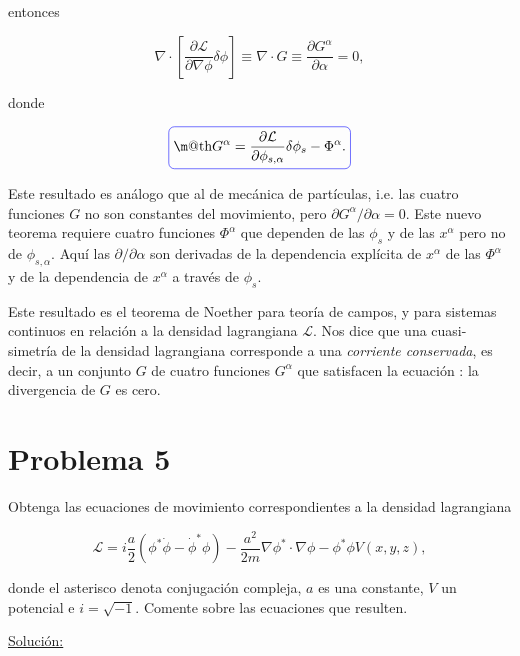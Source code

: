 \documentclass[a4paper,10pt]{article}
\makeatletter
\numberwithin{equation}{section}
\newcommand*{\boxcolor}{blue}
\renewcommand{\boxed}[1]{\textcolor{\boxcolor}{%
\tikz[baseline={([yshift=-1ex]current bounding box.center)}] \node [rectangle, minimum width=1ex,rounded corners,draw] {\normalcolor\m@th$\displaystyle#1$};}}
\makeatother
\begin{document}
entonces 

\begin{equation}
 \nabla \cdot \left[ \frac{\partial \mathcal{L}}{\partial \nabla \phi} \delta \phi \right] 
 \equiv \nabla \cdot G \equiv \frac{\partial G^\alpha}{\partial \alpha} = 0,
 \label{eq:noet9}
\end{equation}

donde 

\begin{equation}
 \boxed{G^\alpha = \frac{\partial \mathcal{L}}{\partial \phi_{s,\alpha}}\delta \phi_s - 
 \Phi^\alpha.}
 \label{eq:noet10}
\end{equation}

Este resultado es análogo que al de mecánica de partículas, i.e. las cuatro funciones 
$G$ no son constantes del movimiento, pero $\partial G^\alpha / \partial \alpha = 0$. Este nuevo 
teorema requiere cuatro funciones $\Phi^\alpha$ que dependen de las $\phi_s$ y de las 
$x^\alpha$ pero no de $\phi_{s,\alpha}$. Aquí las $\partial/\partial \alpha$ son derivadas 
de la dependencia explícita de $x^\alpha$ de las $\Phi^\alpha$ y de la dependencia de 
$x^\alpha$ a través de $\phi_s$. 

\vspace{.3cm}

Este resultado es el teorema de Noether para teoría de campos, y para sistemas continuos 
en relación a la densidad lagrangiana $\mathcal{L}$. Nos dice que una cuasi-simetría 
de la densidad lagrangiana corresponde a una \emph{corriente conservada}, es decir, 
a un conjunto $G$ de cuatro funciones $G^\alpha$ que satisfacen la ecuación 
: la divergencia de $G$ es cero.


\section{Problema 5}

Obtenga las ecuaciones de movimiento correspondientes a la densidad lagrangiana 

$$
\mathcal{L} = i\frac{a}{2} \left( \phi^*\dot{\phi} - \dot{\phi}^*\phi \right)  
- \frac{a^2}{2m}\nabla \phi^* \cdot \nabla \phi - \phi^*\phi V(x,y,z),
$$

donde el asterisco denota conjugación compleja, $a$ es una constante, $V$ un 
potencial e $i=\sqrt{-1}$. Comente sobre las ecuaciones que resulten.

\vspace{.3cm}

\underline{Solución:} \vspace{.3cm}
\end{document}
